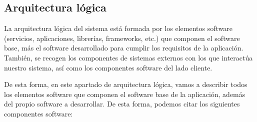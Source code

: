 \subsection{Arquitectura lógica}
La arquitectura lógica del sistema está formada por los elementos software
(servicios, aplicaciones, librerías, frameworks, etc.) que componen el software
base, más el software desarrollado para cumplir los requisitos de la aplicación.
También, se recogen los componentes de sistemas externos con los que interactúa
nuestro sistema, así como los componentes software del lado cliente.

De esta forma, en este apartado de arquitectura lógica, vamos a describir todos
los elementos software que componen el software base de la aplicación, además
del propio software a desarrollar. De esta forma, podemos citar los siguientes
componentes software:
